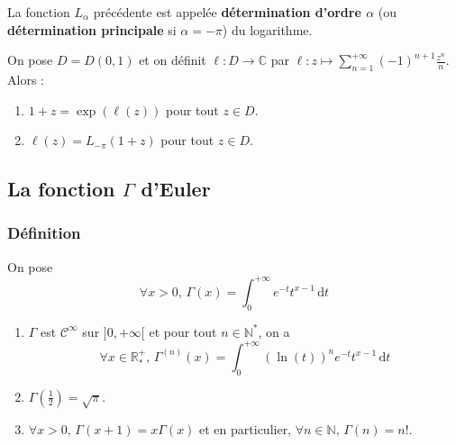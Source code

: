   \begin{definition}
    La fonction $L_\alpha$ précédente est appelée \textbf{détermination d'ordre $\alpha$} (ou \textbf{détermination principale} si $\alpha = -\pi$) du logarithme.
  \end{definition}

  \begin{theorem}
    On pose $D = D(0,1)$ et on définit $\ell : D \rightarrow \mathbb{C}$ par $\ell : z \mapsto \sum_{n=1}^{+\infty} (-1)^{n+1} \frac{z^n}{n}$. Alors :
    \begin{enumerate}[label={\bfseries(\roman*)}]
      \item $1 + z = \exp(\ell(z))$ pour tout $z \in D$.
      \item $\ell(z) = L_{-\pi}(1+z)$ pour tout $z \in D$.
    \end{enumerate}
  \end{theorem}

  \subsection{La fonction \texorpdfstring{$\Gamma$}{Gamma} d'Euler}

  \subsubsection{Définition}


  \begin{definition}
    On pose
    \[ \forall x > 0, \, \Gamma(x) = \int_0^{+\infty} e^{-t} t^{x-1} \, \mathrm{d}t \]
  \end{definition}

  \begin{proposition}
    \begin{enumerate}[label={\bfseries(\roman*)}]
      \item $\Gamma$ est $\mathcal{C}^\infty$ sur $]0, +\infty[$ et pour tout $n \in \mathbb{N}^*$, on a
      \[ \forall x \in \mathbb{R}_*^+, \, \Gamma^{(n)}(x) = \int_{0}^{+\infty} (\ln(t))^n e^{-t} t^{x-1} \, \mathrm{d}t \]
      \item $\Gamma \left( \frac{1}{2} \right) = \sqrt{\pi}$.
      \item $\forall x > 0, \, \Gamma(x+1) = x \Gamma(x)$ et en particulier, $\forall n \in \mathbb{N}, \, \Gamma(n) = n!$.
    \end{enumerate}
  \end{proposition}

